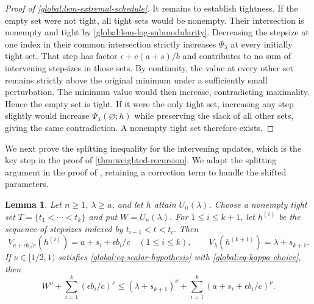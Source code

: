 \documentclass[11pt,letterpaper]{article}
\newtheorem{lemma}[lemma]{Lemma}
\theoremstyle{definition}
\begin{document}
\begin{proof}[Proof of \cref{global:lem-extremal-schedule}]
It remains to establish tightness.
If the empty set were not tight, all tight sets would be nonempty.
Their intersection is nonempty and tight by \cref{global:lem-log-submodularity}.
Decreasing the stepsize at one index in their common intersection strictly increases $\Psi_\lambda$ at every initially tight set. That step has factor $\epsilon+c(a+s)/b$ and contributes to no sum of intervening stepsizes in those sets.
By continuity, the value at every other set remains strictly above the original minimum under a sufficiently small perturbation.
The minimum value would then increase, contradicting maximality.
Hence the empty set is tight.
If it were the only tight set, increasing any step slightly would increase $\Psi_\lambda(\varnothing;h)$ while preserving the slack of all other sets, giving the same contradiction.
A nonempty tight set therefore exists.
\end{proof}

We next prove the splitting inequality for the intervening updates, which is the key step in the proof of \cref{thm:weighted-recursion}.
We adapt the splitting argument in the proof of \citet[Lemma~3.2, Appendix~C.6]{JungChoYun2026}, retaining a correction term to handle the shifted parameters.

\begin{lemma}
\label{global:lem-gap-splitting}
Let $n\ge1$, $\lambda\ge a$, and let $h$ attain $U_n(\lambda)$.
Choose a nonempty tight set $T=\{t_1<\cdots<t_k\}$ and put $W=U_n(\lambda)$.
For $1\le i\le k+1$, let $h^{(i)}$ be the sequence of stepsizes indexed by $t_{i-1}<t<t_i$.
Then
\begin{equation}
  V_{a+\epsilon b_i/c}(h^{(i)})=a+s_i+\epsilon b_i/c\quad(1\le i\le k),
  \qquad
  V_\lambda(h^{(k+1)})=\lambda+s_{k+1}.
  \label{global:eq-gap-identities}
\end{equation}
If $\nu\in[1/2,1)$ satisfies \eqref{global:eq-scalar-hypothesis} with \eqref{global:eq-kappa-choice}, then
\begin{equation*}
  W^\nu+\sum_{i=1}^k(\epsilon b_i/c)^\nu
  \le(\lambda+s_{k+1})^\nu+\sum_{i=1}^k(a+s_i+\epsilon b_i/c)^\nu.
\end{equation*}
\end{lemma}
\end{document}
